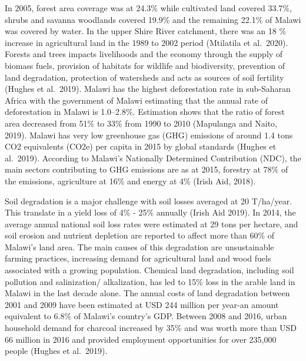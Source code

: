 \documentclass[
]{book}
\begin{document}
In 2005, forest area coverage was at 24.3\% while cultivated land covered 33.7\%, shrubs and savanna woodlands covered 19.9\% and the remaining 22.1\% of Malawi was
covered by water. In the upper Shire River catchment, there was an 18 \% increase in agricultural land in the 1989 to 2002 period (Mtilatila et al.~2020). Forests
and trees impacts livelihoods and the economy through the supply of biomass fuels, provision of habitats for wildlife and biodiversity, prevention of land
degradation, protection of watersheds and acts as sources of soil fertility (Hughes et al.~2019). Malawi has the highest deforestation rate in sub-Saharan Africa
with the government of Malawi estimating that the annual rate of deforestation in Malawi is 1.0--2.8\%. Estimation shows that the ratio of forest area decreased from 51\% to 33\% from 1990 to 2010 (Mapulanga and Naito, 2019). Malawi has very low greenhouse gas (GHG) emissions of around 1.4 tons CO2 equivalents (CO2e) per capita in 2015 by global standards (Hughes et al.~2019). According to Malawi's Nationally Determined Contribution (NDC), the main sectors contributing to GHG emissions are as at 2015, forestry at 78\% of the emissions, agriculture at 16\% and energy at 4\% (Irish Aid, 2018).

Soil degradation is a major challenge with soil losses averaged at 20 T/ha/year. This translate in a yield loss of 4\% - 25\% annually (Irish Aid 2019). In 2014, the average annual national soil loss rates were estimated at 29 tons per hectare, and soil erosion and nutrient depletion are reported to affect more than 60\% of Malawi's land area. The main causes of this degradation are unsustainable farming practices, increasing demand for agricultural land and wood fuels associated with a growing population. Chemical land degradation, including soil pollution and salinization/ alkalization, has led to 15\% loss in the arable land in Malawi in the last decade alone. The annual costs of land degradation between 2001 and 2009 have been estimated at USD 244 million per year-an amount equivalent to 6.8\% of Malawi's country's GDP. Between 2008 and 2016, urban household demand for charcoal increased by 35\% and was worth more than USD 66 million in 2016 and provided employment opportunities for over 235,000 people (Hughes et al.~2019).
\end{document}
